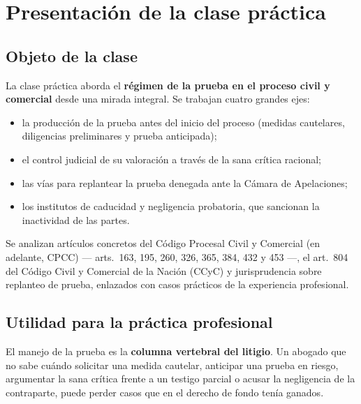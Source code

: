 \documentclass[12pt,oneside]{book}
\begin{document}
\tableofcontents


\chapter[Presentación]{Presentación de la clase práctica}

\section{Objeto de la clase}

La clase práctica aborda el \textbf{régimen de la prueba en el proceso civil y comercial} desde una mirada integral. Se trabajan cuatro grandes ejes:

\begin{itemize}
    \item la producción de la prueba antes del inicio del proceso (medidas cautelares, diligencias preliminares y prueba anticipada);
    \item el control judicial de su valoración a través de la sana crítica racional;
    \item las vías para replantear la prueba denegada ante la Cámara de Apelaciones;
    \item los institutos de caducidad y negligencia probatoria, que sancionan la inactividad de las partes.
\end{itemize}

Se analizan artículos concretos del Código Procesal Civil y Comercial (en adelante, CPCC) --- arts.\ 163, 195, 260, 326, 365, 384, 432 y 453 ---, el art.\ 804 del Código Civil y Comercial de la Nación (CCyC) y jurisprudencia sobre replanteo de prueba, enlazados con casos prácticos de la experiencia profesional.

\section{Utilidad para la práctica profesional}

El manejo de la prueba es la \textbf{columna vertebral del litigio}. Un abogado que no sabe cuándo solicitar una medida cautelar, anticipar una prueba en riesgo, argumentar la sana crítica frente a un testigo parcial o acusar la negligencia de la contraparte, puede perder casos que en el derecho de fondo tenía ganados.
\end{document}
